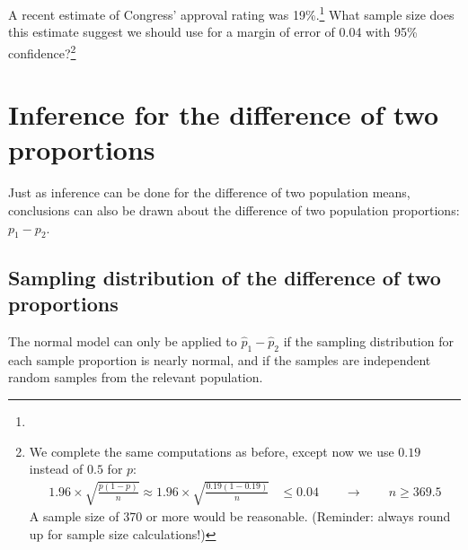 
\begin{exercise}
A recent estimate of Congress' approval rating was 19\%.\footnote{} What sample size does this estimate suggest we should use for a margin of error of 0.04 with 95\% confidence?\footnote{We complete the same computations as before, except now we use $0.19$ instead of $0.5$ for $p$:
\begin{align*}
1.96\times \sqrt{\frac{p(1-p)}{n}} \approx
1.96\times \sqrt{\frac{0.19(1-0.19)}{n}} &\leq 0.04 \qquad\to\qquad n \geq 369.5
\end{align*}
A sample size of 370 or more would be reasonable. (Reminder: always round up for sample size calculations!)}


\end{exercise}


\section{Inference for the difference of two proportions}
\label{differenceOfTwoProportions}

Just as inference can be done for the difference of two population means, conclusions can also be drawn about the difference of two population proportions: $p_1 - p_2$. 

\subsection{Sampling distribution of the difference of two proportions}

The normal model can only be applied to $\hat{p}_1 - \hat{p}_2$ if the sampling distribution for each sample proportion is nearly normal, and if the samples are independent random samples from the relevant population. 

